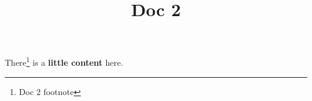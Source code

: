 \documentclass{article}
\begin{document}
\title{Doc 2}

\maketitle


There\footnote{Doc 2 footnote} is a \textbf{little content} here.
\end{document}
